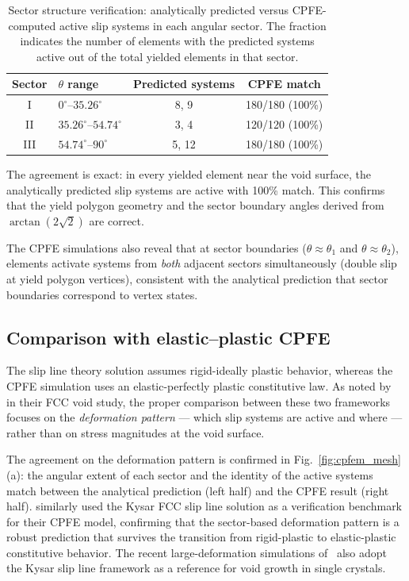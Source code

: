 \documentclass{svjour3} %
\begin{document}
\begin{table}[htb]
\caption{Sector structure verification: analytically predicted versus
CPFE-computed active slip systems in each angular sector. The fraction
indicates the number of elements with the predicted systems active
out of the total yielded elements in that sector.}
\label{tab:sector_verification}
\centering
\begin{tabular}{clcc}
\toprule
Sector & $\theta$ range & Predicted systems & CPFE match \\
\midrule
I   & $0^\circ$--$35.26^\circ$     & 8, 9 & 180/180 (100\%) \\
II  & $35.26^\circ$--$54.74^\circ$ & 3, 4  & 120/120 (100\%) \\
III & $54.74^\circ$--$90^\circ$    & 5, 12 & 180/180 (100\%) \\
\bottomrule
\end{tabular}
\end{table}

The agreement is exact: in every yielded element near the void surface,
the analytically predicted slip systems are active with 100\% match.
This confirms that the yield polygon geometry and the sector boundary
angles derived from $\arctan(2\sqrt{2})$ are correct.

The CPFE simulations also reveal that at sector boundaries
($\theta \approx \theta_1$ and $\theta \approx \theta_2$), elements
activate systems from \emph{both} adjacent sectors simultaneously
(double slip at yield polygon vertices), consistent with the analytical
prediction that sector boundaries correspond to vertex states.

\subsection{Comparison with elastic--plastic CPFE}

The slip line theory solution assumes rigid-ideally plastic behavior,
whereas the CPFE simulation uses an elastic-perfectly plastic
constitutive law. As noted by~\citet{gan2006} in their FCC void study,
the proper comparison between these two frameworks focuses on the
\emph{deformation pattern} --- which slip systems are active and where
--- rather than on stress magnitudes at the void surface.

The agreement on the deformation pattern is confirmed in
Fig.~\ref{fig:cpfem_mesh}(a): the angular extent of each sector and
the identity of the active systems match between the analytical
prediction (left half) and the CPFE result (right half).
\citet{virupakshi2023} similarly used the Kysar FCC slip line solution
as a verification benchmark for their CPFE model, confirming that
the sector-based deformation pattern is a robust prediction that
survives the transition from rigid-plastic to elastic-plastic
constitutive behavior. The recent large-deformation simulations
of~\citet{paux2025} also adopt the Kysar slip line framework as
a reference for void growth in single crystals.
\end{document}
